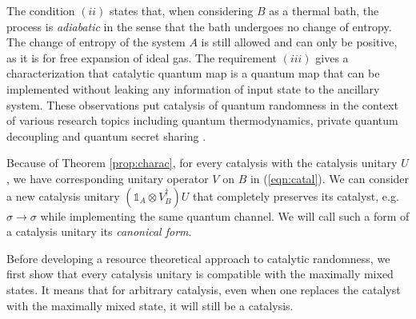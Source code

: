 \documentclass[aps, reprint, amsmath,amssymb, prx, superscriptaddress]{revtex4-2}
\begin{document}
The condition $(ii)$ states that, when considering $B$ as a thermal bath, the process is \textit{adiabatic} in the sense that the bath undergoes no change of entropy. The change of entropy of the system $A$ is still allowed and can only be positive, as it is for free expansion of ideal gas. The requirement $(iii)$ gives a characterization that catalytic quantum map is a quantum map that can be implemented without leaking any information of input state to the ancillary system. These observations put catalysis of quantum randomness in the context of various research topics including quantum thermodynamics, private quantum decoupling \cite{buscemi2009private} and quantum secret sharing \cite{gottesman2000theory,cleve1999share,imai2005information}.

Because of Theorem \ref{prop:charac}, for every catalysis with the catalysis unitary $U$, we have corresponding unitary operator $V$ on $B$ in (\ref{eqn:catal}). We can consider a new catalysis unitary $(\mathds{1}_A \otimes V_B^\dag)U$ that completely preserves its catalyst, e.g. $\sigma \to \sigma$ while implementing the same quantum channel. We will call such a form of a catalysis unitary its \textit{canonical form}. 

Before developing a resource theoretical approach to catalytic randomness, we first show that every catalysis unitary is compatible with the maximally mixed states. It means that for arbitrary catalysis, even when one replaces the catalyst with the maximally mixed state, it will still be a catalysis.
\end{document}
